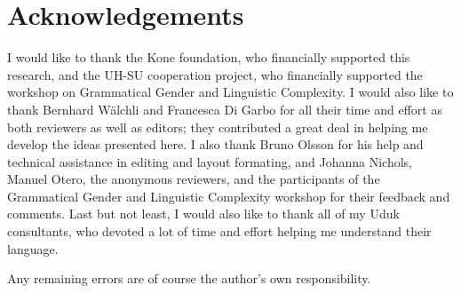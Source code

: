 \documentclass[output=collectionpaper,hidelinks]{langscibook}
\theoremstyle{remark}
\begin{document}
\section*{Acknowledgements}

I would like to thank the Kone foundation, who financially supported this research, and the UH-SU cooperation project, who financially supported the workshop on Grammatical Gender and Linguistic Complexity. I would also like to thank Bernhard Wälchli and Francesca Di Garbo for all their time and effort as both reviewers as well as editors; they contributed a great deal in helping me develop the ideas presented here. I also thank Bruno Olsson for his help and technical assistance in editing and layout formating, and Johanna Nichols, Manuel Otero, the anonymous reviewers, and the participants of the Grammatical Gender and Linguistic Complexity workshop for their feedback and comments. Last but not least, I would also like to thank all of my Uduk consultants, who devoted a lot of time and effort helping me understand their language.

Any remaining errors are of course the author's own responsibility.


\printbibliography[heading=subbibliography]


\label{lastpage:Killian}
\end{document}
